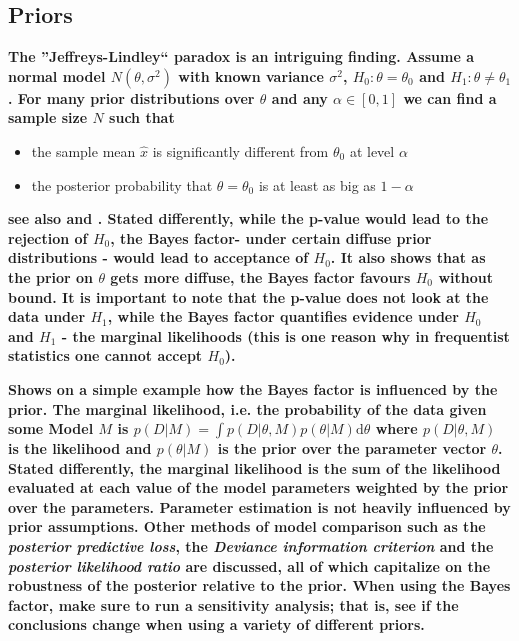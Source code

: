 \documentclass[12pt]{scrartcl}
\begin{document}
\subsection{Priors}
\begin{description}
  \item {}
  
  \textbf{The ''Jeffreys-Lindley`` paradox is an intriguing finding. Assume a normal model $N(\theta, \sigma^2)$ with known variance $\sigma^2$, $H_0: \theta = \theta_0$ and $H_1: \theta \neq \theta_1$. For many prior distributions over $\theta$ and any $\alpha \in [0, 1]$ we can find a sample size $N$ such that}
  
  \begin{itemize}
    \item the sample mean $\hat x$ is significantly different from $\theta_0$ at level $\alpha$
    \item the posterior probability that $\theta = \theta_0$ is at least as big as $1 - \alpha$
  \end{itemize}
  
  \textbf{see also \cite{sprenger2013testing} and \cite{robert2014jeffreys}. Stated differently, while the p-value would lead to the rejection of $H_0$, the Bayes factor- under certain diffuse prior distributions - would lead to acceptance of $H_0$. It also shows that as the prior on $\theta$ gets more diffuse, the Bayes factor favours $H_0$ without bound. It is important to note that the p-value does not look at the data under $H_1$, while the Bayes factor quantifies evidence under $H_0$ and $H_1$ - the marginal likelihoods (this is one reason why in frequentist statistics one cannot accept $H_0$).
  }
 
  \item {}
  
  \textbf{Shows on a simple example how the Bayes factor is influenced by the prior. The marginal likelihood, i.e. the probability of the data given some Model $M$ is $p(D|M) = \int p(D|\theta, M)p(\theta| M) \mathrm{d}\theta$ where $p(D|\theta, M)$ is the likelihood and $p(\theta|M)$ is the prior over the parameter vector $\theta$. Stated differently, the marginal likelihood is the sum of the likelihood evaluated at each value of the model parameters weighted by the prior over the parameters. Parameter estimation is not heavily influenced by prior assumptions. Other methods of model comparison such as the \emph{posterior predictive loss}, the \emph{Deviance information criterion} and the \emph{posterior likelihood ratio} are discussed, all of which capitalize on the robustness of the posterior relative to the prior. When using the Bayes factor, make sure to run a sensitivity analysis; that is, see if the conclusions change when using a variety of different priors.}
  

\end{description}
\end{document}
